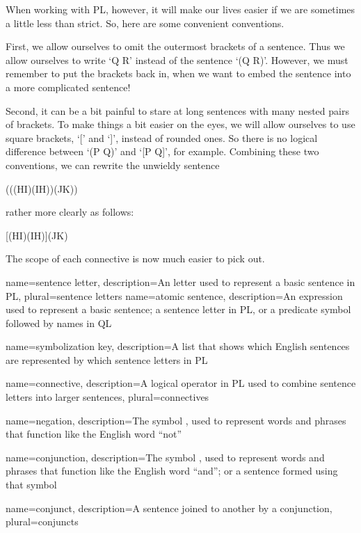 When working with PL, however, it will make our lives easier if we are sometimes a little less than strict. So, here are some convenient conventions.

First, we allow ourselves to omit the outermost brackets of a sentence. Thus we allow ourselves to write ‘Q \eand  R’ instead of the sentence ‘(Q \eand  R)’. However, we must remember to put the brackets back in, when we want to embed the sentence into a more complicated sentence!

Second, it can be a bit painful to stare at long sentences with many nested pairs of brackets. To make things a bit easier on the eyes, we will allow ourselves to use square brackets, ‘[’ and ‘]’, instead of rounded ones. So there is no logical difference between ‘(P \eor  Q)’ and ‘[P \eor  Q]’, for example.
Combining these two conventions, we can rewrite the unwieldy sentence
\begin{center}(((H\eif I)\eor (I\eif H))\eand (J\eor K))\end{center}
rather more clearly as follows:
\begin{center}[(H\eif I)\eor (I\eif H)]\eand (J\eor K)\end{center} 
The scope of each connective is now much easier to pick out.

{
name=sentence letter,
description={An letter used to represent a basic sentence in PL},
plural=sentence letters
}
{
name=atomic sentence,
description={An expression used to represent a basic sentence; a sentence letter in PL, or a predicate symbol followed by names in QL}
}

{
name=symbolization key,
description={A list that shows which English sentences are represented by which \glspl{sentence letter} in PL}
}

{
name=connective,
description={A logical operator in PL used to combine \glspl{sentence letter} into larger sentences},
plural=connectives
}

{
name=negation,
description={The symbol \enot, used to represent words and phrases that function like the English word ``not''}
}

{
name=conjunction,
description={The symbol \eand, used to represent words and phrases that function like the English word ``and''; or a sentence formed using that symbol}
}

{
name=conjunct,
description={A sentence joined to another by a \gls{conjunction}},
plural=conjuncts
}

